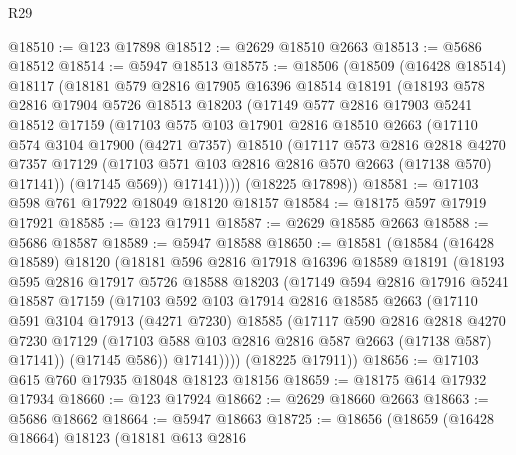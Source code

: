 \begin{lexlean}{R29}
\begin{coremodule}
@18510 := @123 @17898
@18512 := @2629 @18510 @2663
@18513 := @5686 @18512
@18514 := @5947 @18513
@18575 := @18506
    (@18509
      (@16428 @18514)
      @18117
      (@18181
        @579
        @2816
        @17905
        @16396
        @18514
        @18191
        (@18193
          @578
          @2816
          @17904
          @5726
          @18513
          @18203
          (@17149
            @577
            @2816
            @17903
            @5241
            @18512
            @17159
            (@17103
              @575
              @103
              @17901
              @2816
              @18510
              @2663
              (@17110
                @574
                @3104
                @17900
                (@4271 @7357)
                @18510
                (@17117
                  @573
                  @2816
                  @2818
                  @4270
                  @7357
                  @17129
                  (@17103 @571 @103 @2816 @2816 @570 @2663 (@17138 @570) @17141))
                (@17145 @569))
              @17141))))
      (@18225 @17898))
@18581 := @17103 @598 @761 @17922 @18049 @18120 @18157
@18584 := @18175 @597 @17919 @17921
@18585 := @123 @17911
@18587 := @2629 @18585 @2663
@18588 := @5686 @18587
@18589 := @5947 @18588
@18650 := @18581
    (@18584
      (@16428 @18589)
      @18120
      (@18181
        @596
        @2816
        @17918
        @16396
        @18589
        @18191
        (@18193
          @595
          @2816
          @17917
          @5726
          @18588
          @18203
          (@17149
            @594
            @2816
            @17916
            @5241
            @18587
            @17159
            (@17103
              @592
              @103
              @17914
              @2816
              @18585
              @2663
              (@17110
                @591
                @3104
                @17913
                (@4271 @7230)
                @18585
                (@17117
                  @590
                  @2816
                  @2818
                  @4270
                  @7230
                  @17129
                  (@17103 @588 @103 @2816 @2816 @587 @2663 (@17138 @587) @17141))
                (@17145 @586))
              @17141))))
      (@18225 @17911))
@18656 := @17103 @615 @760 @17935 @18048 @18123 @18156
@18659 := @18175 @614 @17932 @17934
@18660 := @123 @17924
@18662 := @2629 @18660 @2663
@18663 := @5686 @18662
@18664 := @5947 @18663
@18725 := @18656
    (@18659
      (@16428 @18664)
      @18123
      (@18181
        @613
        @2816

\end{coremodule}
\end{lexlean}

